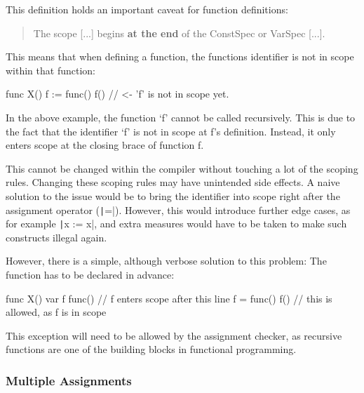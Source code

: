 This definition holds an important caveat for function definitions:
\begin{quote}
    The scope [...] begins \textbf{at the end} of the ConstSpec or VarSpec [...].
\end{quote}

This means that when defining a function, the functions identifier is not
in scope within that function:

\begin{code}
\begin{gocode}
func X() {
    f := func() {
        f() // <- 'f' is not in scope yet.
    }
}
\end{gocode}
\end{code}
In the above example, the function `f' cannot be called recursively. This is due
to the fact that the identifier `f' is not in scope at f's definition. Instead,
it only enters scope at the closing brace of function f.

This cannot be changed within the compiler without touching a lot of the scoping
rules. Changing these scoping rules may have unintended side effects. A naive
solution to the issue would be to bring the identifier into scope right after the
assignment operator (\texttt|=|). However, this would introduce further
edge cases, as for example \texttt|x := x|, and extra measures would have
to be taken to make such constructs illegal again.

However, there is a simple, although verbose solution to this problem: The function
has to be declared in advance:

\begin{code}
    \begin{gocode}
func X() {
    var f func() // f enters scope after this line
    f = func() {
        f() // this is allowed, as f is in scope
    }
}
\end{gocode}
\end{code}
This exception will need to be allowed by the assignment checker, as recursive functions
are one of the building blocks in functional programming.

\subsubsection{Multiple Assignments}


